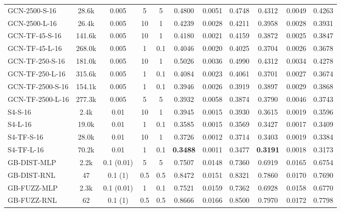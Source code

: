 \begin{table*}[h]
{\begin{tabular}{l c c cc >{\columncolor{gray!20}}ccc >{\columncolor{gray!20}}ccc}
            GCN-2500-S-16 & 28.6k & 0.005 & 5 & 5 & 0.4800 & 0.0051 & 0.4748 & 0.4312 & 0.0049 & 0.4263 \\
            GCN-2500-L-16 & 26.4k & 0.005 & 10 & 1 & 0.4239 & 0.0028 & 0.4211 & 0.3958 & 0.0028 & 0.3931 \\
            \hline
            GCN-TF-45-S-16 & 141.6k & 0.005 & 10 & 1 & 0.4180 & 0.0021 & 0.4159 & 0.3872 & 0.0025 & 0.3847 \\
            GCN-TF-45-L-16 & 268.0k & 0.005 & 1 & 0.1 & 0.4046 & 0.0020 & 0.4025 & 0.3704 & 0.0026 & 0.3678 \\
            GCN-TF-250-S-16 & 181.0k & 0.005 & 10 & 1 & 0.5026 & 0.0036 & 0.4990 & 0.4312 & 0.0034 & 0.4278 \\
            GCN-TF-250-L-16 & 315.6k & 0.005 & 1 & 0.1 & 0.4084 & 0.0023 & 0.4061 & 0.3701 & 0.0027 & 0.3674 \\
            GCN-TF-2500-S-16 & 154.1k & 0.005 & 1 & 0.1 & 0.3946 & 0.0026 & 0.3919 & 0.3897 & 0.0029 & 0.3868 \\
            GCN-TF-2500-L-16 & 277.3k & 0.005 & 5 & 5 & 0.3932 & 0.0058 & 0.3874 & 0.3790 & 0.0046 & 0.3743 \\
            \hline
            S4-S-16 & 2.4k & 0.01 & 10 & 1 & 0.3945 & 0.0015 & 0.3930 & 0.3615 & 0.0019 & 0.3596 \\
            S4-L-16 & 19.0k & 0.01 & 1 & 0.1 & 0.3585 & 0.0015 & 0.3569 & 0.3427 & 0.0017 & 0.3409 \\
            \hline
            S4-TF-S-16 & 28.0k & 0.01 & 10 & 1 & 0.3726 & 0.0012 & 0.3714 & 0.3403 & 0.0019 & 0.3384 \\
            S4-TF-L-16 & 70.2k & 0.01 & 1 & 0.1 & \textbf{0.3488} & 0.0011 & 0.3477 & \textbf{0.3191} & 0.0018 & 0.3173 \\
            \hline
            GB-DIST-MLP & 2.2k & 0.1 (0.01) & 5 & 5 & 0.7507 & 0.0148 & 0.7360 & 0.6919 & 0.0165 & 0.6754 \\
            GB-DIST-RNL & 47 & 0.1 (1) & 0.5 & 0.5 & 0.8472 & 0.0151 & 0.8321 & 0.7860 & 0.0170 & 0.7690 \\
            \hline
            GB-FUZZ-MLP & 2.3k & 0.1 (0.01) & 1 & 0.1 & 0.7521 & 0.0159 & 0.7362 & 0.6928 & 0.0158 & 0.6770 \\
            GB-FUZZ-RNL & 62 & 0.1 (1) & 0.5 & 0.5 & 0.8666 & 0.0166 & 0.8500 & 0.7970 & 0.0172 & 0.7798 \\
            \hline
            \hline
        \end{tabular}
    }
\end{table*}


